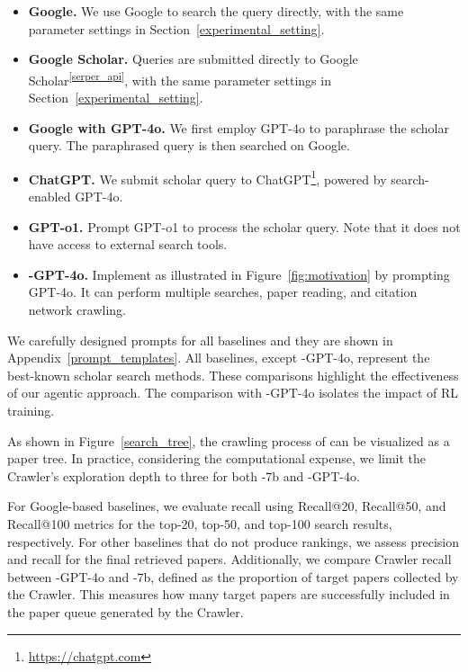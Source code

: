 \begin{itemize}

\item{\bf Google.} We use Google to search the query directly, with the same parameter settings in Section~\ref{experimental_setting}.

\item{\bf Google Scholar.} Queries are submitted directly to Google Scholar\textsuperscript{\ref{serper_api}}, with the same parameter settings in Section~\ref{experimental_setting}.

\item{\bf Google with GPT-4o.} We first employ GPT-4o to paraphrase the scholar query. The paraphrased query is then searched on Google.

\item{\bf ChatGPT.} We submit scholar query to ChatGPT\footnote{\url{https://chatgpt.com}}, powered by search-enabled GPT-4o.

\item{\bf GPT-o1.} Prompt GPT-o1 to process the scholar query. Note that it does not have access to external search tools.

\item{\bf \pasa-GPT-4o.} Implement \pasa as illustrated in Figure~\ref{fig:motivation} by prompting GPT-4o. It can perform multiple searches, paper reading, and citation network crawling. 
\end{itemize}

We carefully designed prompts for all baselines and they are shown in Appendix~\ref{prompt_templates}. All baselines, except \pasa-GPT-4o, represent the best-known scholar search methods. These comparisons highlight the effectiveness of our agentic approach. The comparison with \pasa-GPT-4o isolates the impact of RL training. 

As shown in Figure~\ref{search_tree}, the crawling process of \pasa can be visualized as a paper tree. In practice, considering the computational expense, we limit the Crawler's exploration depth to three for both \pasa-7b and \pasa-GPT-4o. 

For Google-based baselines, we evaluate recall using Recall@20, Recall@50, and Recall@100 metrics for the top-20, top-50, and top-100 search results, respectively. For other baselines that do not produce rankings, we assess precision and recall for the final retrieved papers. Additionally, we compare Crawler recall between \pasa-GPT-4o and \pasa-7b, defined as the proportion of target papers collected by the Crawler. This measures how many target papers are successfully included in the paper queue generated by the Crawler.

